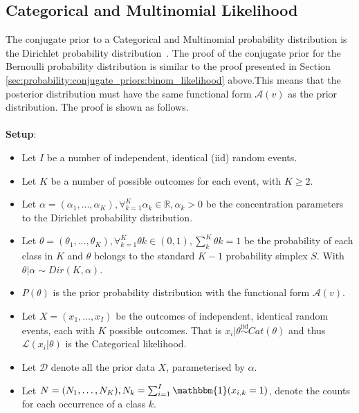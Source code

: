 \subsection{Categorical and Multinomial Likelihood}
\label{sec:probability:conjugate_priors:cat_mult_likelihood}

The conjugate prior to a Categorical and Multinomial probability distribution is the Dirichlet probability distribution~\cite{ref:wackerly:2014}. The proof of the conjugate prior for the Bernoulli probability distribution is similar to the proof presented in Section \ref{sec:probability:conjugate_priors:binom_likelihood} above.This means that the posterior distribution must have the same functional form $\mathcal{A}(v)$ as the prior distribution. The proof is shown as follows. \\\\
\textbf{Setup}:

\begin{itemize}
      \item Let $I$ be a number of independent, identical (iid) random events.

      \item Let $K$ be a number of possible outcomes for each event, with $K \geq 2$.

      \item Let $\alpha = (\alpha_{1}, \dots, \alpha_{K}), \forall_{k=1}^{K} \alpha_{k} \in \mathbb{R}, \alpha_{k} > 0$ be the concentration parameters to the Dirichlet probability distribution.

      \item Let $\theta = (\theta_{1}, \dots, \theta_{K}), \forall_{k=1}^{K} \theta{k} \in (0,1), \sum_{k}^{K} \theta{k} = 1$ be the probability of each class in $K$ and $\theta$ belongs to the standard $K-1$ probability simplex $S$. With $\theta | \alpha \sim Dir(K, \alpha)$.

      \item $P(\theta)$ is the prior probability distribution with the functional form $\mathcal{A}(v)$.

      \item Let $X = (x_{1}, \dots, x_{I})$ be the outcomes of independent, identical random events, each with $K$ possible outcomes. That is $x_{i} | \theta \overset{\text{iid}}{\sim} Cat(\theta)$ and thus $\mathcal{L}(x_{i} \vert \theta)$ is the Categorical likelihood.

      \item Let $\mathcal{D}$ denote all the prior data $X$, parameterised by $\alpha$.

      \item Let $N = (N_{1}, \dots, N_{K}), N_{k} = \sum_{i=1}^{I} \mathbbm{1}(x_{i,k} = 1)$, denote the counts for each occurrence of a class $k$.
\end{itemize}

